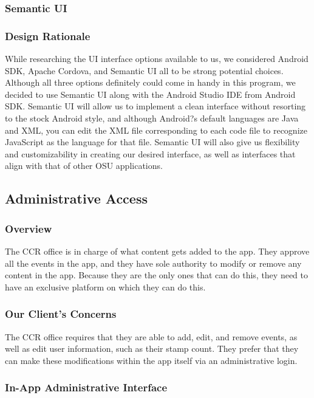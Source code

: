 \documentclass[draftclsnofoot, onecolumn, 10pt, compsoc]{IEEEtran}
\begin{document}
			\subsubsection{Semantic UI}
			\subsubsection{Design Rationale}
				While researching the UI interface options available to us, we considered Android SDK, Apache Cordova, and Semantic UI all to be strong potential choices. Although all three options definitely could come in handy in this program, we decided to use Semantic UI along with the Android Studio IDE from Android SDK. Semantic UI will allow us to implement a clean interface without resorting to the stock Android style, and although Android?s default languages are Java and XML, you can edit the XML file corresponding to each code file to recognize JavaScript as the language for that file. Semantic UI will also give us flexibility and customizability in creating our desired interface, as well as interfaces that align with that of other OSU applications.

		\subsection{Administrative Access}
			\subsubsection{Overview}
				The CCR office is in charge of what content gets added to the app. They approve all the events in the app, and they have sole authority to modify or remove any content in the app. Because they are the only ones that can do this, they need to have an exclusive platform on which they can do this.
			\subsubsection{Our Client's Concerns}
				The CCR office requires that they are able to add, edit, and remove events, as well as edit user information, such as their stamp count. They prefer that they can make these modifications within the app itself via an administrative login.
			\subsubsection{In-App Administrative Interface}
\end{document}
